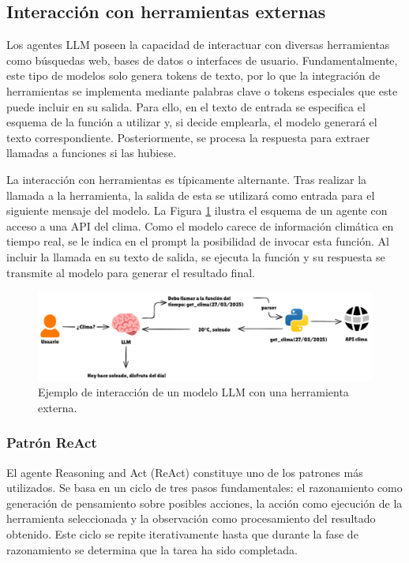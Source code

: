 \subsection{Interacción con herramientas externas}
Los agentes LLM poseen la capacidad de interactuar con diversas herramientas como búsquedas web, bases de datos o interfaces de usuario. Fundamentalmente, este tipo de modelos solo genera tokens de texto, por lo que la integración de herramientas se implementa mediante palabras clave o tokens especiales que este puede incluir en su salida. Para ello, en el texto de entrada se especifica el esquema de la función a utilizar y, si decide emplearla, el modelo generará el texto correspondiente. Posteriormente, se procesa la respuesta para extraer llamadas a funciones si las hubiese.

La interacción con herramientas es típicamente alternante. Tras realizar la llamada a la herramienta, la salida de esta se utilizará como entrada para el siguiente mensaje del modelo. La Figura \ref{fig:herramientas} ilustra el esquema de un agente con acceso a una API del clima. Como el modelo carece de información climática en tiempo real, se le indica en el prompt la posibilidad de invocar esta función. Al incluir la llamada en su texto de salida, se ejecuta la función y su respuesta se transmite al modelo para generar el resultado final.

\begin{figure}[H]
  \centering
  \hspace{-3.60cm}\includegraphics[width=1.25\linewidth]{figures/herramienta.png}
  \caption{Ejemplo de interacción de un modelo LLM con una herramienta externa.}
  \label{fig:herramientas}
\end{figure}


\subsubsection{Patrón ReAct}
\label{sec:react}
El agente Reasoning and Act (ReAct) constituye uno de los patrones más utilizados\cite{yao_react_2023}. Se basa en un ciclo de tres pasos fundamentales: el razonamiento como generación de pensamiento sobre posibles acciones, la acción como ejecución de la herramienta seleccionada y la observación como procesamiento del resultado obtenido. Este ciclo se repite iterativamente hasta que durante la fase de razonamiento se determina que la tarea ha sido completada.

